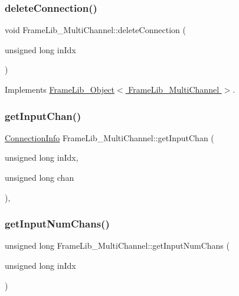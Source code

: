 \subsubsection{\texorpdfstring{delete\+Connection()}{deleteConnection()}}
{\footnotesize\ttfamily void Frame\+Lib\+\_\+\+Multi\+Channel\+::delete\+Connection (\begin{DoxyParamCaption}\item[{unsigned long}]{in\+Idx }\end{DoxyParamCaption})\hspace{0.3cm}{\ttfamily [virtual]}}



Implements \hyperlink{class_frame_lib___object_a4ed6892941c7b68c885b38c202f336b3}{Frame\+Lib\+\_\+\+Object$<$ Frame\+Lib\+\_\+\+Multi\+Channel $>$}.

\mbox{\label{class_frame_lib___multi_channel_a484bbcd67d139f4166c1b731e63d3b92}} 
\subsubsection{\texorpdfstring{get\+Input\+Chan()}{getInputChan()}}
{\footnotesize\ttfamily \hyperlink{struct_frame_lib___multi_channel_1_1_connection_info}{Connection\+Info} Frame\+Lib\+\_\+\+Multi\+Channel\+::get\+Input\+Chan (\begin{DoxyParamCaption}\item[{unsigned long}]{in\+Idx,  }\item[{unsigned long}]{chan }\end{DoxyParamCaption})\hspace{0.3cm}{\ttfamily [inline]}, {\ttfamily [protected]}}

\mbox{\label{class_frame_lib___multi_channel_a8ba357b72ac5103d936e7416384294e0}} 
\subsubsection{\texorpdfstring{get\+Input\+Num\+Chans()}{getInputNumChans()}}
{\footnotesize\ttfamily unsigned long Frame\+Lib\+\_\+\+Multi\+Channel\+::get\+Input\+Num\+Chans (\begin{DoxyParamCaption}\item[{unsigned long}]{in\+Idx }\end{DoxyParamCaption})\hspace{0.3cm}{\ttfamily [protected]}}

